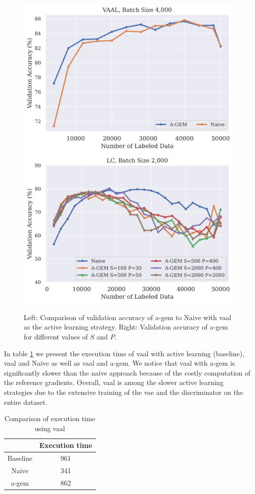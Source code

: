 \begin{figure}[h]
    \centering
    \includegraphics[width=0.48\linewidth]{images/results_CAL/vaal_agem_naive.png} \hfill
    \includegraphics[width=0.48\linewidth]{images/results_CAL/agem_lc.png}
    \caption[Continual active learning with \gls{a-gem}]{Left: Comparison of validation accuracy of \gls{a-gem} to Naive with \gls{vaal} as the active learning strategy.
    Right: Validation accuracy of \gls{a-gem} for different values of $S$ and $P$.}
    \label{fig:Evaluation:Results:CAL:AGEM}
\end{figure}

In table \ref{fig:Evaluation:CAL:VAAL_AGEM_Time} we present the execution time of \gls{vaal} with active learning (baseline), \gls{vaal} and Naive as well as \gls{vaal}
and \gls{a-gem}. We notice that \gls{vaal} with \gls{a-gem} is significantly slower than the naive approach because of the costly computation of the reference
gradients. Overall, \gls{vaal} is among the slower active learning strategies due to the extensive training of the \gls{vae} and the discriminator on the
entire dataset. \par

\begin{table}[h]
    \centering
    \begin{tabular}{c | c } 
         & Execution time\\ 
        \hline 
        Baseline & 961 \\
        Naive & 341 \\
        \gls{a-gem} & 862 \\
    \end{tabular}
    \caption{Comparison of execution time using \gls{vaal}}
    \label{fig:Evaluation:CAL:VAAL_AGEM_Time}
\end{table}


